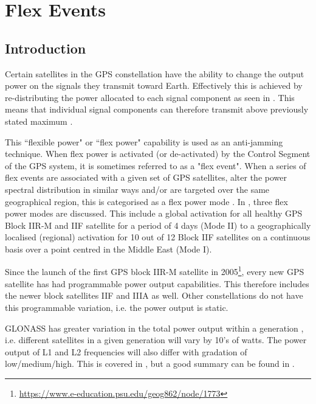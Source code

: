 \chapter{Flex Events}
\label{ch:flex_events}

\section{Introduction}

Certain satellites in the GPS constellation have the ability to change the output power on the signals they transmit toward Earth. Effectively this is achieved by re-distributing the power allocated to each signal component as seen in \cite{steigenberger_flex_2018}. This means that individual signal components can therefore transmit above previously stated maximum \citep[sec. 6.3.1]{IS-GPS-200G_2012}. 


This ``flexible power" or ``flex power" capability is used as an anti-jamming technique. When flex power is activated (or de-activated) by the Control Segment of the GPS system, it is sometimes referred to as a "flex event". When a series of flex events are associated with a given set of GPS satellites, alter the power spectral distribution in similar ways and/or are targeted over the same geographical region, this is categorised as a flex power mode \citep{steigenberger_flex_2018}. In \cite{steigenberger_flex_2018}, three flex power modes are discussed. This include a global activation for all healthy GPS Block IIR-M and IIF satellite for a period of 4 days (Mode II) to a geographically localised (regional) activation for 10 out of 12 Block IIF satellites on a continuous basis over a point centred in the Middle East (Mode I).


Since the launch of the first GPS block IIR-M satellite in 2005\footnote{\url{https://www.e-education.psu.edu/geog862/node/1773}}, every new GPS satellite has had programmable power output capabilities. This therefore includes the newer block satellites IIF and IIIA as well. Other constellations do not have this programmable variation, i.e. the power output is static.


GLONASS has greater variation in the total power output within a generation , i.e. different satellites in a given generation will vary by 10’s of watts. The power output of L1 and L2 frequencies will also differ with gradation of low/medium/high. This is covered in \citep{steigenberger_flex_2018}, but a good summary can be found in \cite{steigenberger_gps_2019}.


